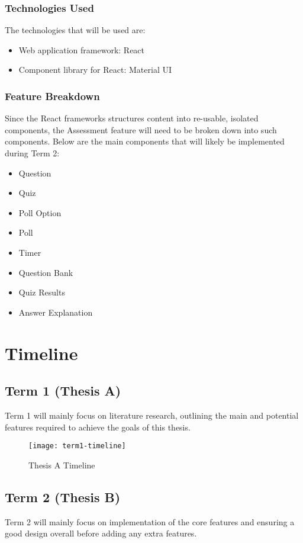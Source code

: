 \subsubsection{Technologies Used}
The technologies that will be used are:
\begin{itemize}
	\item Web application framework: React
	\item Component library for React: Material UI
\end{itemize}

\subsubsection{Feature Breakdown}
Since the React frameworks structures content into re-usable, isolated components, the Assessment feature will need to be broken down into such components. Below are the main components that will likely be implemented during Term 2:
\begin{itemize}
	\item Question
	\item Quiz
	\item Poll Option
	\item Poll
	\item Timer
	\item Question Bank
	\item Quiz Results
	\item Answer Explanation
\end{itemize}


\section{Timeline}
\subsection{Term 1 (Thesis A)}
Term 1 will mainly focus on literature research, outlining the main and potential features required to achieve the goals of this thesis.\\

\begin{figure}[h!]
	\centering
	\texttt{[image: term1-timeline]}
	\caption{Thesis A Timeline}
\end{figure}

\subsection{Term 2 (Thesis B)}
Term 2 will mainly focus on implementation of the core features and ensuring a good design overall before adding any extra features.\\

